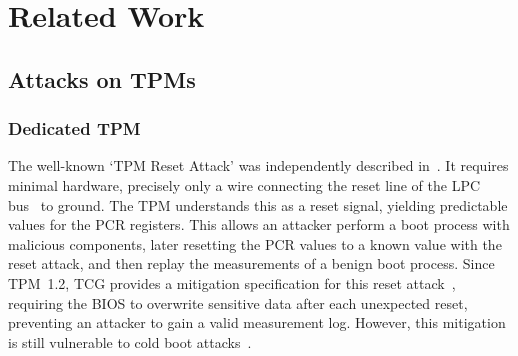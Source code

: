 
\chapter{Related Work}\label{chapter:related_work}

\section{Attacks on TPMs}

\subsection{Dedicated TPM}

The well-known `TPM Reset Attack' was independently described in~\cite{kauerBernhard,sparks2007}.
It requires minimal hardware, precisely only a wire connecting the reset line of the LPC bus~\cite{lpc} to ground.
The TPM understands this as a reset signal, yielding predictable values for the \ac{PCR} registers.
This allows an attacker perform a boot process with malicious components, later resetting the \ac{PCR} values to a known value with the reset attack, and then replay the measurements of a benign boot process.
Since TPM~1.2, TCG provides a mitigation specification for this reset attack~\cite{tcgResetFix}, requiring the BIOS to overwrite sensitive data after each unexpected reset, preventing an attacker to gain a valid measurement log.
However, this mitigation is still vulnerable to cold boot attacks~\cite{Halderman2009, Winter2013}.

